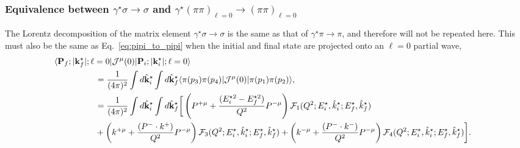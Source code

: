 \subsubsection{Equivalence between $\gamma^\star\sigma\to\sigma$ and $\gamma^\star(\pi\pi)_{\ell=0}\to(\pi\pi)_{\ell=0}$}
	The Lorentz decomposition of the matrix element $\gamma^\star\sigma\to\sigma$ is the same as that of $\gamma^\star\pi\to\pi$, and therefore will not be repeated here. This must also be the same as Eq.~\ref{eq:pipi_to_pipi} when the initial and final state are projected onto an $\ell=0$ partial wave,
\begin{align}
\langle{\bf P}_f;|{\bf k}^\star_f|;\ell=0|{\cal J}^\mu(0)|{\bf P}_i;|{\bf k}^\star_i|;\ell=0\rangle\, \nn\\
&\hspace{-4cm}
=
\frac{1}{(4\pi)^2}\int d\hat{\bf k}^\star_i\int d\hat{\bf k}^\star_f
\langle \pi(p_3)\pi(p_4)|{\cal J}^\mu(0)|\pi(p_1)\pi(p_2)\rangle,\nn\\
&\hspace{-4cm}=
\frac{1}{(4\pi)^2}\int d\hat{\bf k}^\star_i\int d\hat{\bf k}^\star_f\bigg[ \left(P^{+\mu}+\frac{(E_i^{\star 2}-E_f^{\star 2})}{Q^2} P^{-\mu}\right)\mathcal{F}_{1}(Q^2;E_i^\star,\hat{k}^\star_i;E_f^\star,\hat{k}^\star_f)
\nn\\
&\hspace{-4cm}
+
\left(k^{+\mu}+\frac{(P^-\cdot k^{+})}{Q^2} P^{-\mu}\right)
\mathcal{F}_{3}(Q^2;E_i^\star,\hat{k}^\star_i;E_f^\star,\hat{k}^\star_f)
+
\left(k^{-\mu}+\frac{(P^-\cdot k^{-})}{Q^2} P^{-\mu}\right)
\mathcal{F}_{4}(Q^2;E_i^\star,\hat{k}^\star_i;E_f^\star,\hat{k}^\star_f)\bigg].
\label{eq:pipi_to_pipi_Swave}
\end{align}



